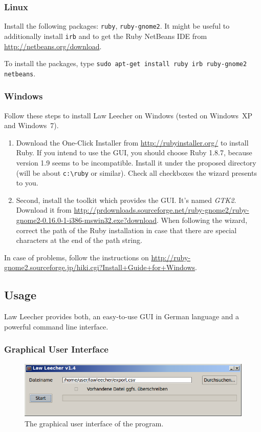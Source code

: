 \documentclass{scrartcl}
\begin{document}
\subsubsection{Linux}
Install the following packages: \texttt{ruby}, \texttt{ruby-gnome2}. It might be useful to additionally install \texttt{irb} and to get the Ruby NetBeans IDE from \url{http://netbeans.org/download}.

To install the packages, type \texttt{sudo apt-get install ruby irb ruby-gnome2 netbeans}.

\subsubsection{Windows}
Follow these steps to install Law Leecher on Windows (tested on Windows~XP and Windows~7).

\begin{enumerate}
\item Download the One-Click Installer from \url{http://rubyinstaller.org/} to install Ruby. If you intend to use the GUI, you should choose Ruby 1.8.7, because version 1.9 seems to be incompatible. Install it under the proposed directory (will be about \texttt{c:\textbackslash ruby} or similar). Check all checkboxes the wizard presents to you.

\item Second, install the toolkit which provides the GUI. It's named \textit{GTK2}. Download it from \url{http://prdownloads.sourceforge.net/ruby-gnome2/ruby-gnome2-0.16.0-1-i386-mswin32.exe?download}. When following the wizard, correct the path of the Ruby installation in case that there are special characters at the end of the path string. 
\end{enumerate}
In case of problems, follow the instructions on \url{http://ruby-gnome2.sourceforge.jp/hiki.cgi?Install+Guide+for+Windows}.


\subsection{Usage}
Law Leecher provides both, an easy-to-use GUI in German language and a powerful command line interface.

\subsubsection{Graphical User Interface}
\begin{figure}[ht]
\begin{center}
\includegraphics[width = 0.92 \textwidth]{GUI.png}
\caption{The graphical user interface of the program.}
\label{fig:guiwindow}
\end{center}
\end{figure}
\end{document}
